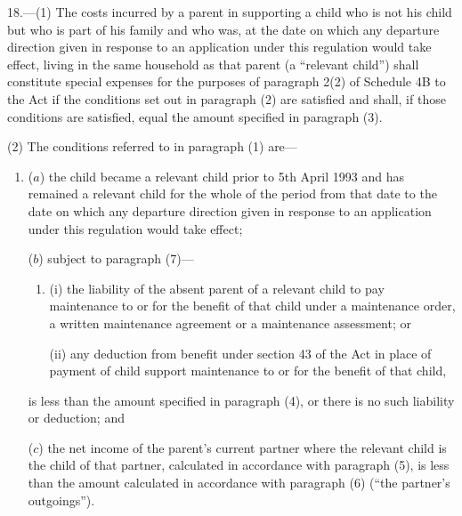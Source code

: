 \documentclass[12pt,a4paper]{article}
\begin{document}
18.—(1) The costs incurred by a parent in supporting a child who is not his child but who is part of his family 
and who was, at the date on which any departure direction given in response to an application under this regulation would take effect, living in the same household as that parent  %
(a “relevant child”) shall constitute special expenses for the purposes of paragraph 2(2) of Schedule 4B to the Act if the conditions set out in paragraph (2) are satisfied and shall, if those conditions are satisfied, equal the amount specified in paragraph (3).

(2) The conditions referred to in paragraph (1) are—
\begin{enumerate}\item[]

($a$) the child became a relevant child prior to 5th April 1993 and has remained a relevant child for the whole of the period from that date to the date on which any departure direction given in response to an application under this regulation would take effect;


($b$) subject to paragraph (7)—
\begin{enumerate}\item[]
(i) the liability of the absent parent of a relevant child to pay maintenance to or for the benefit of that child under a maintenance order, a written maintenance agreement or a maintenance assessment; or

(ii) any deduction from benefit under section 43 of the Act in place of payment of child support maintenance to or for the benefit of that child,
\end{enumerate}
is less than the amount specified in paragraph (4), or there is no such liability or deduction; and

($c$) the net income of the parent’s current partner where the relevant child is
the child of that partner, calculated in accordance with paragraph (5), is less
than the amount calculated in accordance with paragraph (6) (“the partner’s
outgoings”).
\end{enumerate}
\end{document}
